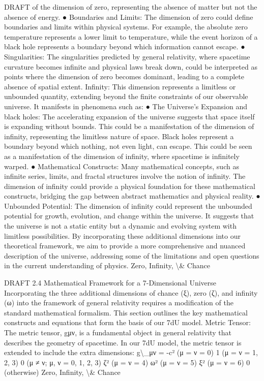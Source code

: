 \documentclass[12pt]{article}
\begin{document}
DRAFT
of the dimension of zero, representing the absence of matter but not the
absence of energy.
●
Boundaries and Limits: The dimension of zero could deﬁne boundaries and
limits within physical systems. For example, the absolute zero temperature
represents a lower limit to temperature, while the event horizon of a black hole
represents a boundary beyond which information cannot escape.
●
Singularities: The singularities predicted by general relativity, where spacetime
curvature becomes inﬁnite and physical laws break down, could be interpreted
as points where the dimension of zero becomes dominant, leading to a
complete absence of spatial extent.
Inﬁnity: This dimension represents a limitless or unbounded quantity, extending beyond
the ﬁnite constraints of our observable universe. It manifests in phenomena such as:
●
The Universe's Expansion and black holes: The accelerating expansion of the
universe suggests that space itself is expanding without bounds. This could be a
manifestation of the dimension of inﬁnity, representing the limitless nature of
space. Black holes represent a boundary beyond which nothing, not even light,
can escape. This could be seen as a manifestation of the dimension of inﬁnity,
where spacetime is inﬁnitely warped.
●
Mathematical Constructs: Many mathematical concepts, such as inﬁnite series,
limits, and fractal structures involve the notion of inﬁnity. The dimension of
inﬁnity could provide a physical foundation for these mathematical constructs,
bridging the gap between abstract mathematics and physical reality.
●
Unbounded Potential: The dimension of inﬁnity could represent the unbounded
potential for growth, evolution, and change within the universe. It suggests that
the universe is not a static entity but a dynamic and evolving system with
limitless possibilities.
By incorporating these additional dimensions into our theoretical framework, we aim to
provide a more comprehensive and nuanced description of the universe, addressing
some of the limitations and open questions in the current understanding of physics.
Zero, Infinity, \textbackslash{}& Chance

DRAFT
2.4 Mathematical Framework for a 7-Dimensional Universe
Incorporating the three additional dimensions of chance (ξ), zero (ζ), and inﬁnity (ω) into
the framework of general relativity requires a modiﬁcation of the standard mathematical
formalism. This section outlines the key mathematical constructs and equations that
form the basis of our 7dU model.
Metric Tensor:
The metric tensor, gμν, is a fundamental object in general relativity that describes the
geometry of spacetime. In our 7dU model, the metric tensor is extended to include the
extra dimensions:
g\textbackslash{}_μν =
-c² (μ = ν = 0)
1
(μ = ν = 1, 2, 3)
0
(μ ≠ ν; μ, ν = 0, 1, 2, 3)
ζ²
(μ = ν = 4)
ω²
(μ = ν = 5)
ξ²
(μ = ν = 6)
0
(otherwise)
Zero, Infinity, \textbackslash{}& Chance
\end{document}
